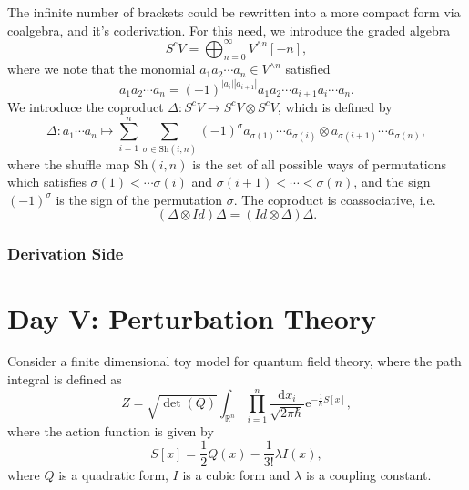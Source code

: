 \documentclass[10pt]{article}
\begin{document}
The infinite number of brackets could be rewritten into a more compact form via coalgebra, and it's coderivation. For this need, we introduce the graded algebra
\begin{equation*}
  S^{c} V = \bigoplus_{n=0}^{\infty} V^{\wedge n}[-n],
\end{equation*}
where we note that the monomial $ a_1 a_2\cdots a_n \in V^{\wedge n}$ satisfied
\begin{equation*}
  a_1 a_2 \cdots a_n = (-1)^{\left| a_i \right| \left| a_{i+1} \right|} a_1 a_2 \cdots a_{i+1} a_i \cdots a_n.
\end{equation*}
We introduce the coproduct $ \Delta : S^{c} V \rightarrow S^{c} V \otimes S^{c} V$, which is defined by
\begin{equation*}
  \Delta : a_1 \cdots a_n \mapsto \sum_{i=1}^{n} \sum_{\sigma \in \mathrm{Sh}(i,n)} (-1)^{\sigma} a_{\sigma(1)} \cdots a_{\sigma(i)} \otimes a_{\sigma(i+1)} \cdots a_{\sigma(n)},
\end{equation*}
where the shuffle map $ \mathrm{Sh}(i,n)$ is the set of all possible ways of permutations which satisfies $ \sigma(1) < \cdots \sigma(i)$ and $ \sigma(i+1) < \cdots < \sigma(n)$,
and the sign $ (-1)^{\sigma}$ is the sign of the permutation $\sigma$.
The coproduct is coassociative, i.e.
\begin{equation*}
  (\Delta \otimes Id) \Delta = (Id \otimes \Delta) \Delta.
\end{equation*}

\subsubsection{Derivation Side}

\section{Day V: Perturbation Theory}

Consider a finite dimensional toy model for quantum field theory, where the path integral is defined as
\begin{equation*}
  Z = \sqrt{\det(Q)} \int _{\mathbb{R}^{n}} \prod_{i=1}^{n} \frac{\mathrm{d} x_i}{\sqrt{2 \pi \hbar}} \mathrm{e}^{- \frac{1}{\hbar} S[x]},
\end{equation*}
where the action function is given by
\begin{equation*}
  S[x] = \frac{1}{2} Q(x) - \frac{1}{3!} \lambda I(x),
\end{equation*}
where $ Q$ is a quadratic form, $ I$ is a cubic form and $ \lambda$ is a coupling constant.
\end{document}
